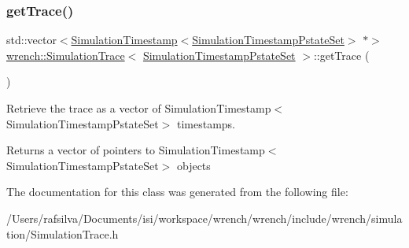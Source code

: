 \subsubsection{\texorpdfstring{get\+Trace()}{getTrace()}}
{\footnotesize\ttfamily std\+::vector$<$\hyperlink{classwrench_1_1_simulation_timestamp}{Simulation\+Timestamp}$<$\hyperlink{classwrench_1_1_simulation_timestamp_pstate_set}{Simulation\+Timestamp\+Pstate\+Set}$>$ $\ast$$>$ \hyperlink{classwrench_1_1_simulation_trace}{wrench\+::\+Simulation\+Trace}$<$ \hyperlink{classwrench_1_1_simulation_timestamp_pstate_set}{Simulation\+Timestamp\+Pstate\+Set} $>$\+::get\+Trace (\begin{DoxyParamCaption}{ }\end{DoxyParamCaption})\hspace{0.3cm}{\ttfamily [inline]}}



Retrieve the trace as a vector of Simulation\+Timestamp$<$\+Simulation\+Timestamp\+Pstate\+Set$>$ timestamps. 

\begin{DoxyReturn}{Returns}
a vector of pointers to Simulation\+Timestamp$<$\+Simulation\+Timestamp\+Pstate\+Set$>$ objects 
\end{DoxyReturn}


The documentation for this class was generated from the following file\+:\begin{DoxyCompactItemize}
\item 
/\+Users/rafsilva/\+Documents/isi/workspace/wrench/wrench/include/wrench/simulation/Simulation\+Trace.\+h\end{DoxyCompactItemize}
